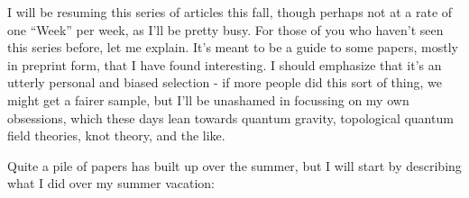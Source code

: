 \documentclass{article}
\def\tightlist{}
\renewcommand{\texttt}[1]{%
  \begingroup
  \ttfamily
  \begingroup\lccode`~=`/\lowercase{\endgroup\def~}{/\discretionary{}{}{}}%
  \begingroup\lccode`~=`[\lowercase{\endgroup\def~}{[\discretionary{}{}{}}%
  \begingroup\lccode`~=`.\lowercase{\endgroup\def~}{.\discretionary{}{}{}}%
  \catcode`/=\active\catcode`[=\active\catcode`.=\active
  \scantokens{#1\noexpand}%
  \endgroup
}
\begin{document}
I will be resuming this series of articles this fall, though perhaps not
at a rate of one ``Week'' per week, as I'll be pretty busy. For those of
you who haven't seen this series before, let me explain. It's meant to
be a guide to some papers, mostly in preprint form, that I have found
interesting. I should emphasize that it's an utterly personal and biased
selection - if more people did this sort of thing, we might get a fairer
sample, but I'll be unashamed in focussing on my own obsessions, which
these days lean towards quantum gravity, topological quantum field
theories, knot theory, and the like.

Quite a pile of papers has built up over the summer, but I will start by
describing what I did over my summer vacation:

\end{document}
